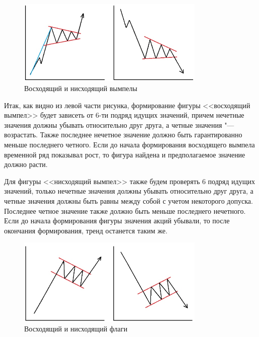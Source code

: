 \documentclass[bachelor, och, coursework]{SCWorks}
\begin{document}
    \begin{figure}[H]
        \centering
        \includegraphics[width=0.8\textwidth]{pic/pennants.jpg}
        \caption{Восходящий и нисходящий вымпелы}
    \end{figure}

    Итак, как видно из левой части рисунка, формирование фигуры <<восходящий
    вымпел>> будет зависеть от 6-ти подряд идущих значений, причем нечетные
    значения должны убывать относительно друг друга, а четные значения "---
    возрастать. Также последнее нечетное значение должно быть гарантированно
    меньше последнего четного. Если до начала формирования восходящего вымпела
    временной ряд показывал рост, то фигура найдена и предполагаемое значение
    должно расти.

    Для фигуры <<нисходящий вымпел>> также будем проверять 6 подряд идущих
    значений, только нечетные значения должны убывать относительно друг друга, а
    четные значения должны быть равны между собой с учетом некоторого допуска.
    Последнее четное значение также должно быть меньше последнего нечетного.
    Если до начала формирования фигуры значения акций убывали, то после
    окончания формирования, тренд останется таким же.

    \begin{figure}[H]
        \centering
        \includegraphics[width=0.8\textwidth]{pic/flags.jpg}
        \caption{Восходящий и нисходящий флаги}
    \end{figure}
\end{document}
